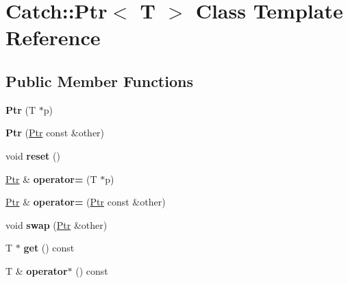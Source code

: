 \hypertarget{classCatch_1_1Ptr}{}\section{Catch\+:\+:Ptr$<$ T $>$ Class Template Reference}
\label{classCatch_1_1Ptr}
\subsection*{Public Member Functions}
\begin{DoxyCompactItemize}
\item 
{\bfseries Ptr} (T $\ast$p)\hypertarget{classCatch_1_1Ptr_aacec063a79cd142e39040a31c6b3c40b}{}\label{classCatch_1_1Ptr_aacec063a79cd142e39040a31c6b3c40b}

\item 
{\bfseries Ptr} (\hyperlink{classCatch_1_1Ptr}{Ptr} const \&other)\hypertarget{classCatch_1_1Ptr_ac629dd8ebe5763a37bb89e6c1d6a1771}{}\label{classCatch_1_1Ptr_ac629dd8ebe5763a37bb89e6c1d6a1771}

\item 
void {\bfseries reset} ()\hypertarget{classCatch_1_1Ptr_af8d0fa7a2cd20842830b354ac31dfe5c}{}\label{classCatch_1_1Ptr_af8d0fa7a2cd20842830b354ac31dfe5c}

\item 
\hyperlink{classCatch_1_1Ptr}{Ptr} \& {\bfseries operator=} (T $\ast$p)\hypertarget{classCatch_1_1Ptr_a9b08c868b447d679ed201921f5c94683}{}\label{classCatch_1_1Ptr_a9b08c868b447d679ed201921f5c94683}

\item 
\hyperlink{classCatch_1_1Ptr}{Ptr} \& {\bfseries operator=} (\hyperlink{classCatch_1_1Ptr}{Ptr} const \&other)\hypertarget{classCatch_1_1Ptr_af42074444c1bc6a70ebdc406a8617708}{}\label{classCatch_1_1Ptr_af42074444c1bc6a70ebdc406a8617708}

\item 
void {\bfseries swap} (\hyperlink{classCatch_1_1Ptr}{Ptr} \&other)\hypertarget{classCatch_1_1Ptr_a172bf8b4e71e26a5a4d92f5b02158b50}{}\label{classCatch_1_1Ptr_a172bf8b4e71e26a5a4d92f5b02158b50}

\item 
T $\ast$ {\bfseries get} () const \hypertarget{classCatch_1_1Ptr_a1617aa5ff058b53ea572cf965617b7ae}{}\label{classCatch_1_1Ptr_a1617aa5ff058b53ea572cf965617b7ae}

\item 
T \& {\bfseries operator$\ast$} () const \hypertarget{classCatch_1_1Ptr_a3a4c139032a8bd1bffa553103d5dbfd3}{}\label{classCatch_1_1Ptr_a3a4c139032a8bd1bffa553103d5dbfd3}


\end{DoxyCompactItemize}
